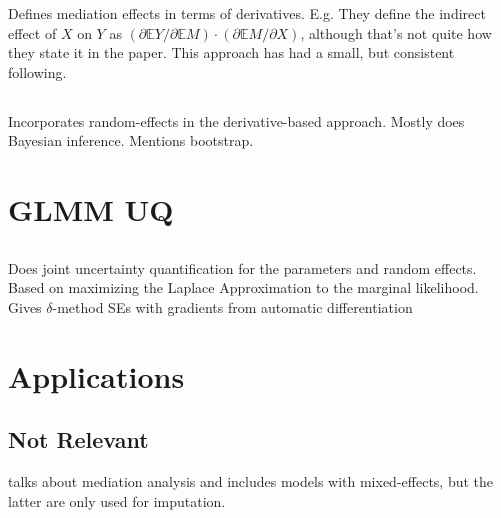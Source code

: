 \documentclass{article}
\newcommand{\bE}{\mathbb{E}}
\begin{document}
Defines mediation effects in terms of derivatives. E.g. They define the indirect effect of $X$ on $Y$ as $(\partial \bE Y/ \partial \bE M) \cdot (\partial \bE M / \partial X)$, although that's not quite how they state it in the paper. This approach has had a small, but consistent following.

\subsection{\citet{Mar24}}

Incorporates random-effects in the derivative-based approach. Mostly does Bayesian inference. Mentions bootstrap.


\section{GLMM UQ}

\subsection{\citet{Zhe21}}

Does joint uncertainty quantification for the parameters and random effects. Based on maximizing the Laplace Approximation to the marginal likelihood. Gives $\delta$-method SEs with gradients from automatic differentiation 


\section{Applications}

\subsection{Not Relevant}

\citet{Bro22} talks about mediation analysis and includes models with mixed-effects, but the latter are only used for imputation.





\end{document}
